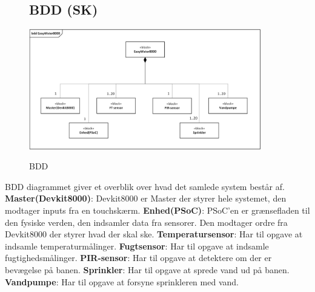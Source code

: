 \begin{figure}[H] \centering
\subsection{BDD (SK)}
{\includegraphics[width=0.9\textwidth]{filer/systemarkitektur/BDD}}
\caption{BDD}
\label{lab:bdd}
\raggedright
\end{figure}
BDD diagrammet giver et overblik over hvad det samlede system består af. \newline \newline
\textbf{Master(Devkit8000)}: Devkit8000 er Master der styrer hele systemet, den modtager inputs fra en touchskærm.  \newline \newline
\textbf{Enhed(PSoC)}: PSoC'en er grænsefladen til den fysiske verden, den indsamler data fra sensorer. Den modtager ordre fra Devkit8000 der styrer hvad der skal ske. 		\newline \newline
\textbf{Temperatursensor}: Har til opgave at indsamle temperaturmålinger. \newline \newline
\textbf{Fugtsensor}: Har til opgave at indsamle fugtighedsmålinger. \newline \newline
\textbf{PIR-sensor}: Har til opgave at detektere om der er bevægelse på banen. \newline \newline
\textbf{Sprinkler}: Har til opgave at sprede vand ud på banen. \newline \newline
\textbf{Vandpumpe}: Har til opgave at forsyne sprinkleren med vand. \newline \newline

